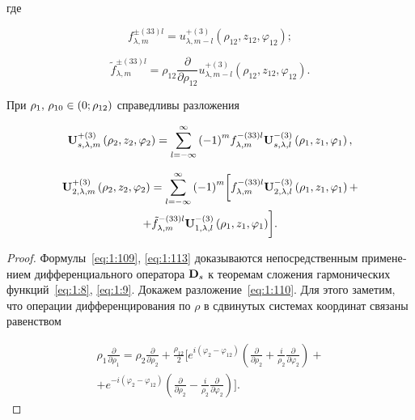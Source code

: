 \begin{russian}
\begin{theorem}
\noindent где

\begin{equation}\label{eq:1:111}
f_{\lambda ,m}^{ \pm (33)l} = u_{\lambda ,m - l}^{ + (3)}\left( {{\rho _{12}},{z_{12}},{\varphi _{12}}} \right);
\end{equation}

\begin{equation}\label{eq:1:112}
\tilde f_{\lambda ,m}^{ \pm (33)l} = {\rho _{12}}\frac{\partial }{{\partial {\rho _{12}}}}u_{\lambda ,m - l}^{ + (3)}\left( {{\rho _{12}},{z_{12}},{\varphi _{12}}} \right).
\end{equation}

При ${\rho _1},{\mkern 1mu} {\kern 1pt} {\rho _{10}} \in \left( {0;{\rho _{12}}} \right)$ справедливы разложения

\begin{equation}\label{eq:1:113}
{\bf{U}}_{s,\lambda ,m}^{ + (3)}\left( {{\rho _2},{z_2},{\varphi _2}} \right) = \sum\limits_{l =  - \infty }^\infty  {{{( - 1)}^m}} f_{\lambda ,m}^{ - (33)l}{\bf{U}}_{s,\lambda ,l}^{ - (3)}\left( {{\rho _1},{z_1},{\varphi _1}} \right),
\end{equation}

\begin{multline}\label{eq:1:114}
{\bf{U}}_{2,\lambda ,m}^{ + (3)}\left( {{\rho _2},{z_2},{\varphi _2}} \right) = \sum\limits_{l =  - \infty }^\infty  {{{( - 1)}^m}} \bigg[ {f_{\lambda ,m}^{ - (33)l}{\bf{U}}_{2,\lambda ,l}^{ - (3)}\left( {{\rho _1},{z_1},{\varphi _1}} \right) + } \\
{ + \tilde f_{\lambda ,m}^{ - (33)l}{\bf{U}}_{1,\lambda ,l}^{ - (3)}\left( {{\rho _1},{z_1},{\varphi _1}} \right)} \bigg].
\end{multline}

\end{theorem}

\begin{proof}
Формулы~\eqref{eq:1:109}, \eqref{eq:1:113} доказываются непосредственным применением дифференциального оператора ${{\bf{D}}_s}$ к теоремам сложения гармонических функций~\eqref{eq:1:8}, \eqref{eq:1:9}. Докажем разложение~\eqref{eq:1:110}. Для этого заметим, что операции дифференцирования по $\rho$ в сдвинутых системах координат связаны равенством

\begin{multline}\label{eq:1:115}
{\rho _1}\frac{\partial }{{\partial {\rho _1}}} = {\rho _2}\frac{\partial }{{\partial {\rho _2}}} + \frac{{{\rho _{12}}}}{2}\bigg[ {e^{i\left( {{\varphi _2} - {\varphi _{12}}} \right)}}\left( {\frac{\partial }{{\partial {\rho _2}}} + \frac{i}{{{\rho _2}}}\frac{\partial }{{\partial {\varphi _2}}}} \right) + \\
+ {e^{ - i\left( {{\varphi _2} - {\varphi _{12}}} \right)}}\left( {\frac{\partial }{{\partial {\rho _2}}} - \frac{i}{{{\rho _2}}}\frac{\partial }{{\partial {\varphi _2}}}} \right) \bigg].
\end{multline}


\end{proof}
\end{russian}
